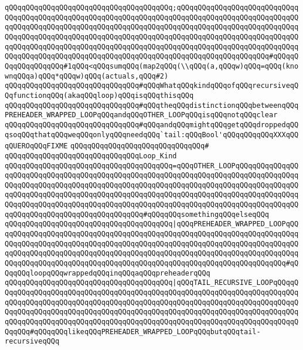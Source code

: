 \verb|qQQqqQQqqQQqqQQqqQQqqQQqqQQqqQQqqQQqqQQq;qQQqqQQqqQQqqQQqqQQqqQQqqQQqqQQqqQQqqQQqqQQqqQQqqQQqqQQqqQQqqQQqqQQqqQQqqQQqqQQqqQQqqQQqqQQqqQQqqQQqqQQqqQQqqQQqqQQqqQQqqQQqqQQqqQQqqQQqqQQqqQQqqQQqqQQqqQQqqQQqqQQqqQQqqQQqqQQqqQQqqQQqqQQqqQQqqQQqqQQqqQQqqQQqqQQqqQQqqQQqqQQqqQQqqQQqqQQqqQQqqQQqqQQqqQQqqQQqqQQqqQQqqQQqqQQqqQQqqQQqqQQqqQQqqQQqqQQqqQQqqQQqqQQqqQQqqQQqqQQqqQQqqQQqqQQqqQQqqQQqqQQqqQQqqQQqqQQqqQQqqQQqqQQqqQQq#qQQqqQQqqQQqqQQqqQQq#1qQQq<qQQqsumqQQq(map2qQQq(\\qQQq(a,qQQqw)qQQq=qQQq(knownqQQqa)qQQq*qQQqw)qQQq(actuals,qQQq#2)|\newline
\newline
\newline
\verb|qQQqqQQqqQQqqQQqqQQqqQQqqQQqqQQq#qQQqWhatqQQqkindqQQqofqQQqrecursiveqQQqfunctionqQQq(akaqQQqloop)qQQqisqQQqthisqQQq|\newline
\verb|qQQqqQQqqQQqqQQqqQQqqQQqqQQqqQQq#qQQqtheqQQqdistinctionqQQqbetweenqQQqPREHEADER_WRAPPED_LOOPqQQqandqQQqOTHER_LOOPqQQqisqQQqnotqQQqclear|\newline
\verb|qQQqqQQqqQQqqQQqqQQqqQQqqQQqqQQq#qQQqandqQQqmightqQQqgetqQQqdroppedqQQqsoqQQqthatqQQqweqQQqonlyqQQqneedqQQq`tail:qQQqBool'qQQqqQQqqQQqXXXqQQqQUEROqQQqFIXME|\newline
\verb|qQQqqQQqqQQqqQQqqQQqqQQqqQQqqQQq#|\newline
\verb|qQQqqQQqqQQqqQQqqQQqqQQqqQQqqQQqLoop_Kind|\newline
\verb|qQQqqQQqqQQqqQQqqQQqqQQqqQQqqQQqqQQqqQQq=qQQqOTHER_LOOPqQQqqQQqqQQqqQQqqQQqqQQqqQQqqQQqqQQqqQQqqQQqqQQqqQQqqQQqqQQqqQQqqQQqqQQqqQQqqQQqqQQqqQQqqQQqqQQqqQQqqQQqqQQqqQQqqQQqqQQqqQQqqQQqqQQqqQQqqQQqqQQqqQQqqQQqqQQqqQQqqQQqqQQqqQQqqQQqqQQqqQQqqQQqqQQqqQQqqQQqqQQqqQQqqQQqqQQqqQQqqQQqqQQqqQQqqQQqqQQqqQQqqQQqqQQqqQQqqQQqqQQqqQQqqQQqqQQqqQQqqQQqqQQqqQQqqQQqqQQqqQQqqQQqqQQqqQQqqQQqqQQqqQQq#qQQqqQQqsomethingqQQqelseqQQq|\newline
\verb|qQQqqQQqqQQqqQQqqQQqqQQqqQQqqQQqqQQqqQQq|\verb#|qQQqPREHEADER_WRAPPED_LOOPqQQqqQQqqQQqqQQqqQQqqQQqqQQqqQQqqQQqqQQqqQQqqQQqqQQqqQQqqQQqqQQqqQQqqQQqqQQqqQQqqQQqqQQqqQQqqQQqqQQqqQQqqQQqqQQqqQQqqQQqqQQqqQQqqQQqqQQqqQQqqQQqqQQqqQQqqQQqqQQqqQQqqQQqqQQqqQQqqQQqqQQqqQQqqQQqqQQqqQQqqQQqqQQqqQQqqQQqqQQqqQQqqQQqqQQqqQQqqQQqqQQqqQQqqQQqqQQqqQQqqQQqqQQqqQQqqQQqqQQq#\verb|#qQQqqQQqloopqQQqwrappedqQQqinqQQqaqQQqpreheaderqQQq|\newline
\verb|qQQqqQQqqQQqqQQqqQQqqQQqqQQqqQQqqQQqqQQq|\verb#|qQQqTAIL_RECURSIVE_LOOPqQQqqQQqqQQqqQQqqQQqqQQqqQQqqQQqqQQqqQQqqQQqqQQqqQQqqQQqqQQqqQQqqQQqqQQqqQQqqQQqqQQqqQQqqQQqqQQqqQQqqQQqqQQqqQQqqQQqqQQqqQQqqQQqqQQqqQQqqQQqqQQqqQQqqQQqqQQqqQQqqQQqqQQqqQQqqQQqqQQqqQQqqQQqqQQqqQQqqQQqqQQqqQQqqQQqqQQqqQQqqQQqqQQqqQQqqQQqqQQqqQQqqQQqqQQqqQQqqQQqqQQqqQQqqQQqqQQqqQQqqQQqqQQqqQQq#\verb|#qQQqqQQqlikeqQQqPREHEADER_WRAPPED_LOOPqQQqbutqQQqtail-recursiveqQQq|\newline
